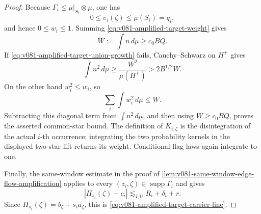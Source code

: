 \documentclass[10pt]{article}
\begin{document}
\begin{proof}
Because \(\Gamma_i\le\mu|_{S_i}\otimes\mu\), one has
\[
0\le e_i(\zeta)\le\mu(S_i)=q_i,
\]
and hence \(0\le w_i\le1\).  Summing
\eqref{eq:v081-amplified-target-weight} gives
\[
W:=\int n\,d\mu\ge c_0BQ.
\]
If \eqref{eq:v081-amplified-target-union-growth} fails, Cauchy--Schwarz on \(H^+\) gives
\[
\int n^2\,d\mu
\ge
\frac{W^2}{\mu(H^+)}
>
2B^{1/2}W.
\]
On the other hand \(w_i^2\le w_i\), so
\[
\sum_i\int w_i^2\,d\mu
\le W.
\]
Subtracting this diagonal term from \(\int n^2\,d\mu\), and then using
\(W\ge c_0BQ\), proves the asserted common-star bound.  The definition of \(K_{i,\zeta}\) is the
disintegration of the actual \(i\)-th occurrence; integrating the two probability kernels in
the displayed two-star lift returns its weight.  Conditional flag
laws again integrate to one.

Finally, the same-window estimate in the proof of
\cref{lem:v081-same-window-edge-flow-amplification} applies to every
\((z_i,\zeta)\in\operatorname{supp}\Gamma_i\) and gives
\[
|\Pi_{s_i}(\zeta)-c_i|
\lesssim_{I,U}
R_i+\delta_i+r.
\]
Since \(\Pi_{s_i}(\zeta)=b_\zeta+s_i a_\zeta\), this is
\eqref{eq:v081-amplified-target-carrier-line}.
\end{proof}
\end{document}
